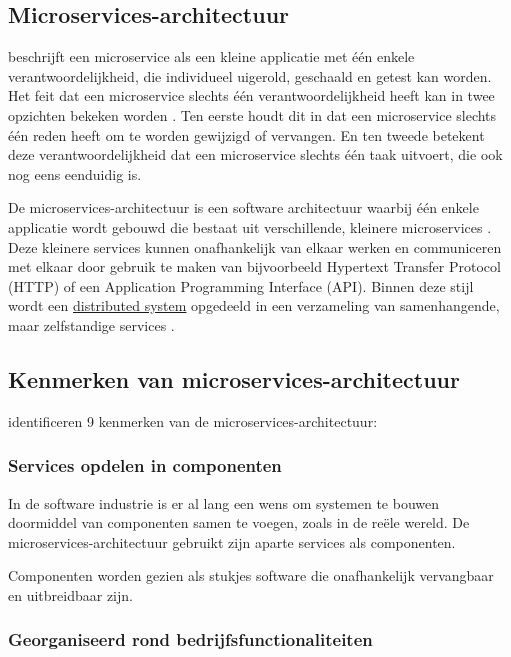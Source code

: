 \subsection{Microservices-architectuur}

\textcite{Thoenes2015} beschrijft een microservice als een kleine applicatie met één enkele verantwoordelijkheid, die individueel uigerold, geschaald en getest kan worden. Het feit dat een microservice slechts één verantwoordelijkheid heeft kan in twee opzichten bekeken worden \autocite{Thoenes2015}. Ten eerste houdt dit in dat een microservice slechts één reden heeft om te worden gewijzigd of vervangen. En ten tweede betekent deze verantwoordelijkheid dat een microservice slechts één taak uitvoert, die ook nog eens eenduidig is.

De microservices-architectuur is een software architectuur waarbij één enkele applicatie wordt gebouwd die bestaat uit verschillende, kleinere microservices \autocite{Lewis2014}. Deze kleinere services kunnen onafhankelijk van elkaar werken en communiceren met elkaar door gebruik te maken van bijvoorbeeld Hypertext Transfer Protocol (HTTP) of een Application Programming Interface (API). Binnen deze stijl wordt een \hyperref[sec:dissys]{distributed system} opgedeeld in een verzameling van samenhangende, maar zelfstandige services \autocite{Limon2018}.

\subsection{Kenmerken van microservices-\-architectuur}

\textcite{Lewis2014} identificeren 9 kenmerken van de microservices-architectuur:

\subsubsection{Services opdelen in componenten}

In de software industrie is er al lang een wens om systemen te bouwen doormiddel van componenten samen te voegen, zoals in de reële wereld. De microservices-architectuur gebruikt zijn aparte services als componenten.

Componenten worden gezien als stukjes software die onafhankelijk vervangbaar en uitbreidbaar zijn.

\subsubsection{Georganiseerd rond bedrijfsfunctionaliteiten}

